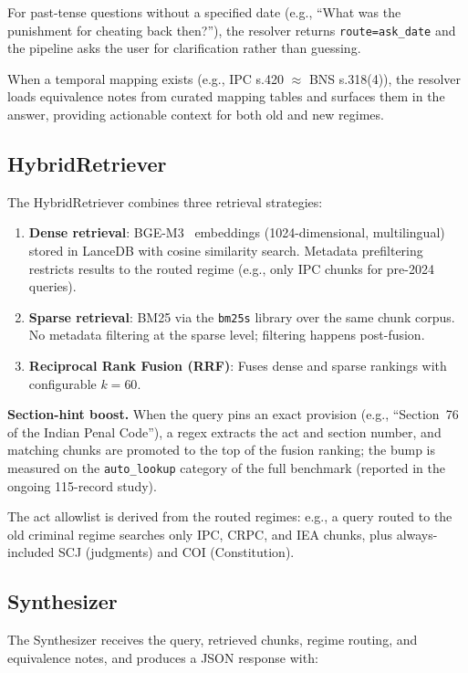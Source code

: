 \documentclass[conference]{IEEEtran}
\begin{document}
For past-tense questions without a specified date (e.g., ``What was the punishment for cheating back then?''), the resolver returns \texttt{route=ask\_date} and the pipeline asks the user for clarification rather than guessing.

When a temporal mapping exists (e.g., IPC s.420 $\approx$ BNS s.318(4)), the resolver loads equivalence notes from curated mapping tables and surfaces them in the answer, providing actionable context for both old and new regimes.

\subsection{HybridRetriever}
\label{ssec:retriever}

The HybridRetriever combines three retrieval strategies:

\begin{enumerate}
    \item \textbf{Dense retrieval}: BGE-M3~\cite{bge-m3} embeddings (1024-dimensional, multilingual) stored in LanceDB with cosine similarity search. Metadata prefiltering restricts results to the routed regime (e.g., only IPC chunks for pre-2024 queries).
    \item \textbf{Sparse retrieval}: BM25 via the \texttt{bm25s} library over the same chunk corpus. No metadata filtering at the sparse level; filtering happens post-fusion.
    \item \textbf{Reciprocal Rank Fusion (RRF)}: Fuses dense and sparse rankings with configurable $k=60$.
\end{enumerate}

\textbf{Section-hint boost.} When the query pins an exact provision (e.g., ``Section~76 of the Indian Penal Code''), a regex extracts the act and section number, and matching chunks are promoted to the top of the fusion ranking; the bump is measured on the \texttt{auto\_lookup} category of the full benchmark (reported in the ongoing 115-record study).

The act allowlist is derived from the routed regimes: e.g., a query routed to the old criminal regime searches only IPC, CRPC, and IEA chunks, plus always-included SCJ (judgments) and COI (Constitution).

\subsection{Synthesizer}
\label{ssec:synthesizer}

The Synthesizer receives the query, retrieved chunks, regime routing, and equivalence notes, and produces a JSON response with:
\end{document}
